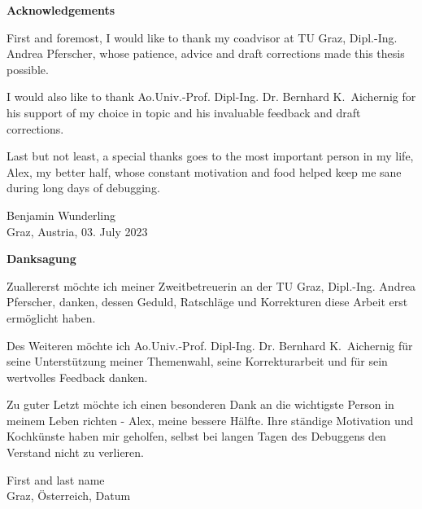 



\begin{center}
{\Large\bfseries Acknowledgements}
\end{center}


\begin{changemargin}{1.5cm}{1.5cm}
First and foremost, I would like to thank my coadvisor at TU Graz, Dipl.-Ing. Andrea Pferscher, whose patience, advice and draft corrections made this thesis possible. 

I would also like to thank Ao.Univ.-Prof. Dipl-Ing. Dr. Bernhard K.~Aichernig for his support of my choice in topic and his invaluable feedback and draft corrections.

Last but not least, a special thanks goes to the most important person in my life, Alex, my better half, whose constant motivation and food helped keep me sane during long days of debugging.

\begin{flushright}
Benjamin Wunderling \\ {\small Graz, Austria, 03. July 2023}
\end{flushright}
\end{changemargin}


\newpage

\begin{center}
{\Large\bfseries Danksagung}

\end{center}

\begin{changemargin}{1.5cm}{1.5cm}
Zuallererst möchte ich meiner Zweitbetreuerin an der TU Graz, Dipl.-Ing. Andrea Pferscher, danken, dessen Geduld, Ratschläge und Korrekturen diese Arbeit erst ermöglicht haben.

Des Weiteren möchte ich Ao.Univ.-Prof. Dipl-Ing. Dr. Bernhard K.~Aichernig für seine Unterstützung meiner Themenwahl, seine Korrekturarbeit und für sein wertvolles Feedback danken.

Zu guter Letzt möchte ich einen besonderen Dank an die wichtigste Person in meinem Leben richten - Alex, meine bessere Hälfte. Ihre ständige Motivation und Kochkünste haben mir geholfen, selbst bei langen Tagen des Debuggens den Verstand nicht zu verlieren.
\begin{flushright}
First and last name \\ {\small Graz, \"Osterreich, Datum}
\end{flushright}
\end{changemargin}








